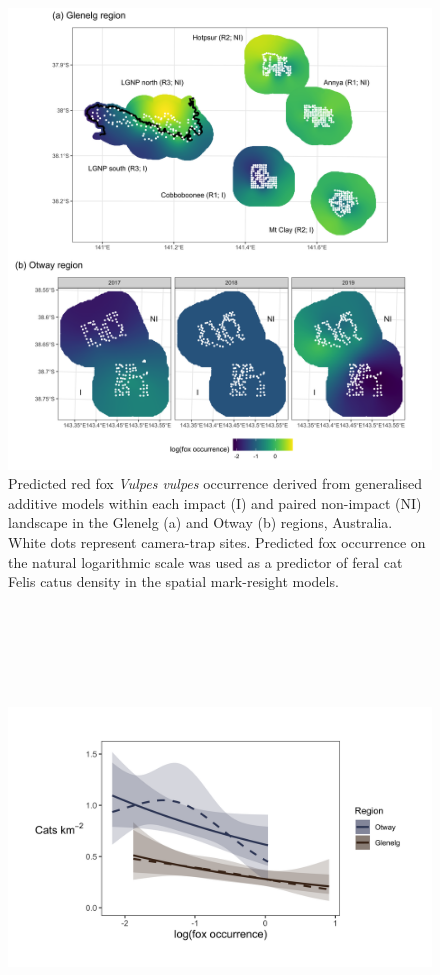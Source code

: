 \documentclass[11pt,a4paper,titlepage,twoside,openright]{style/unimelbthesis}
\begin{document}
\begin{mainmatter}
\newpage

\(~\)

\(~\)

\(~\)
\begin{figure}

{\centering \includegraphics[width=1\linewidth]{figure/fox_occ_map} 

}

\caption{Predicted red fox \textit{Vulpes vulpes} occurrence derived from generalised additive models within each impact (I) and paired non-impact (NI) landscape in the Glenelg (a) and Otway (b) regions, Australia. White dots represent camera-trap sites. Predicted fox occurrence on the natural logarithmic scale was used as a predictor of feral cat Felis catus density in the spatial mark-resight models.}\label{fig:foxplot}
\end{figure}
\newpage

\(~\)

\(~\)

\(~\)
\begin{figure}

{\centering \includegraphics[width=1\linewidth]{figure/foxD_600dpi} 

}
\end{figure}
\end{mainmatter}
\end{document}
